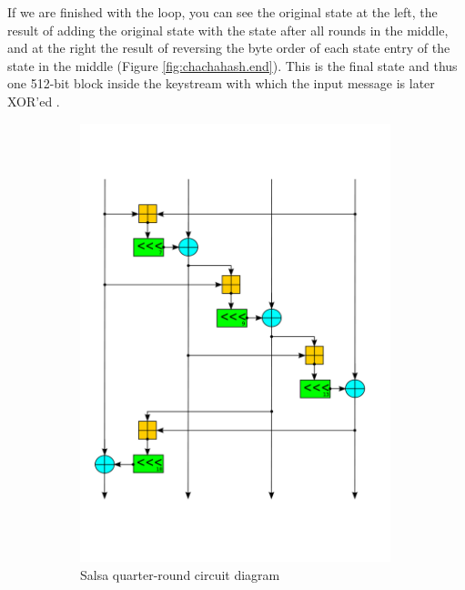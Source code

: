 If we are finished with the loop, you can see the original state at the left, the result of adding the original state with the state after all rounds in the middle, and at the right the result of reversing the byte order of each state entry of the state in the middle (Figure \ref{fig:chachahash.end}). This is the final state and thus one 512-bit block inside the keystream with which the input message is later XOR'ed .

\begin{figure}
\centering
\begin{subfigure}[t]{0.5\textwidth}
  \centering
  \includegraphics[width=0.99\textwidth]{figures/wiki-qr-circuit/salsa-wiki-qr-circuit.png}
  \caption{Salsa quarter-round circuit diagram}
  \label{fig:wiki.qr.circuit.salsa}
\end{subfigure}%
\begin{subfigure}[t]{0.5\textwidth}
  \centering

\end{subfigure}
\end{figure}
